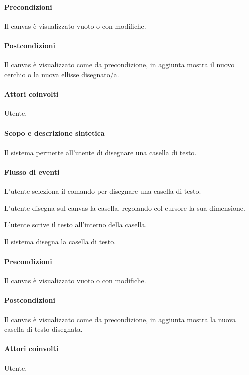 \paragraph{Precondizioni} Il canvas \`e visualizzato vuoto o con modifiche.
\paragraph{Postcondizioni} Il canvas \`e visualizzato come da precondizione, in aggiunta mostra il nuovo cerchio o la nuova ellisse disegnato/a.

\paragraph{Attori coinvolti} Utente.
\paragraph{Scopo e descrizione sintetica} 
Il sistema permette all'utente di disegnare una casella di testo.
\paragraph{Flusso di eventi}
\begin{elenconumerato}[\textbf{}]{\subsubsecindent}
\item L'utente seleziona il comando per disegnare una casella di testo.
\item L'utente disegna sul canvas la casella, regolando col cursore la sua dimensione.
\item L'utente scrive il testo all'interno della casella.
\item Il sistema disegna la casella di testo.
\end{elenconumerato}
\paragraph{Precondizioni} Il canvas \`e visualizzato vuoto o con modifiche.
\paragraph{Postcondizioni} Il canvas \`e visualizzato come da precondizione, in aggiunta mostra la nuova casella di testo disegnata.

\paragraph{Attori coinvolti} Utente.
